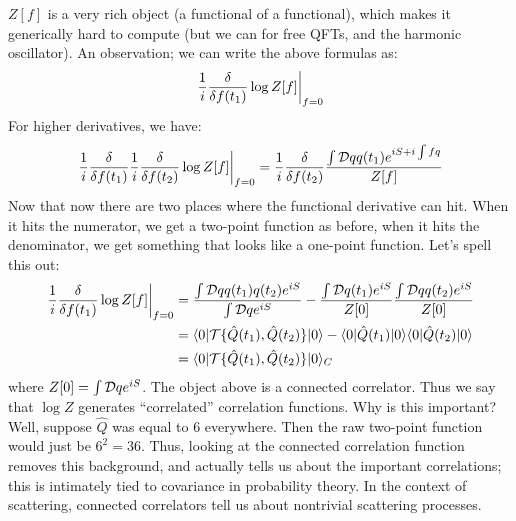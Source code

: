 $Z[f]$ is a very rich object (a functional of a functional), which makes it generically hard to compute (but we can for free QFTs, and the harmonic oscillator). An observation; we can write the above formulas as:
\begin{equation}
    \left.\frac{1}{i}\frac{\delta }{\delta f(t_1)}\log Z[f]\right|_{f=0}
\end{equation}
For higher derivatives, we have:
\begin{equation}
    \left.\frac{1}{i}\frac{\delta }{\delta f(t_1)}\frac{1}{i}\frac{\delta }{\delta f(t_2)}\log Z[f]\right|_{f=0} = \frac{1}{i}\frac{\delta }{\delta f(t_2)}\frac{\int \mathcal{D} q q(t_1)e^{iS + i\int fq}}{Z[f]}
\end{equation}
Now that now there are two places where the functional derivative can hit. When it hits the numerator, we get a two-point function as before, when it hits the denominator, we get something that looks like a one-point function. Let's spell this out:
\begin{equation}
    \begin{split}
        \left.\frac{1}{i}\frac{\delta }{\delta f(t_1)}\log Z[f]\right|_{f=0} &= \frac{\int \mathcal{D} q q(t_1)q(t_2)e^{iS}}{\int \mathcal{D} q e^{iS}} - \frac{\int \mathcal{D} q(t_1)e^{iS}}{Z[0]}\frac{\int \mathcal{D} q q(t_2)e^{iS}}{Z[0]}
        \\ &= \langle 0 \rvert\mathcal{T}\{\hat{Q}(t_1), \hat{Q}(t_2)\}\lvert 0 \rangle - \langle 0 \rvert\hat{Q}(t_1)\lvert 0 \rangle\langle 0 \rvert\hat{Q}(t_2)\lvert 0 \rangle
        \\ &= \langle 0 \rvert\mathcal{T}\{\hat{Q}(t_1), \hat{Q}(t_2)\}\lvert 0 \rangle_C
    \end{split}
\end{equation}
where $Z[0] = \int \mathcal{D} q e^{iS}$. The object above is a connected correlator. Thus we say that $\log Z$ generates ``correlated'' correlation functions. Why is this important? Well, suppose $\hat{Q}$ was equal to 6 everywhere. Then the raw two-point function would just be $6^2 = 36$. Thus, looking at the connected correlation function removes this background, and actually tells us about the important correlations; this is intimately tied to covariance in probability theory. In the context of scattering, connected correlators tell us about nontrivial scattering processes.

